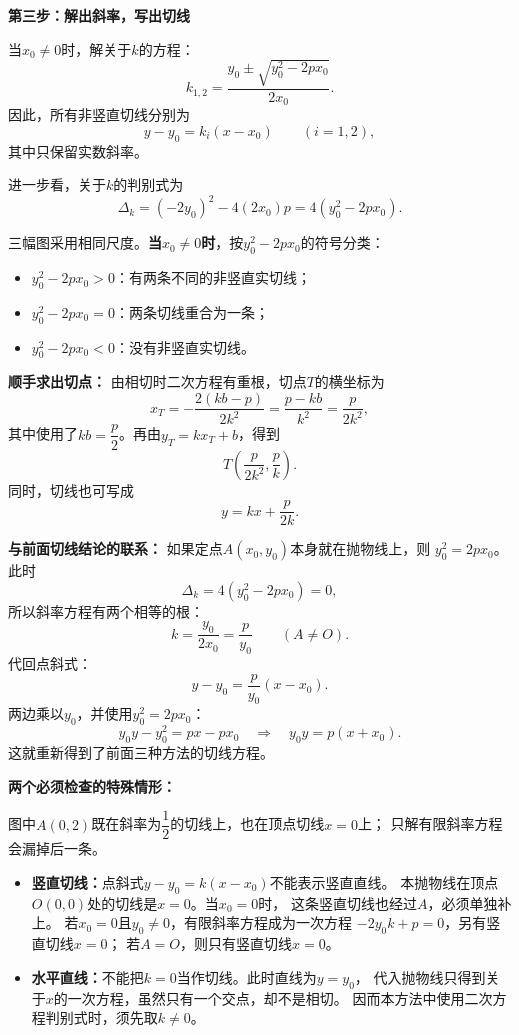 \begin{proofbox}
\textbf{第三步：解出斜率，写出切线}

当$x_0\ne0$时，解关于$k$的方程：
\[
    \boxed{
    k_{1,2}=
    \frac{y_0\pm\sqrt{y_0^2-2px_0}}{2x_0}
    }.
\]
因此，所有非竖直切线分别为
\[
    \boxed{
    y-y_0=k_i(x-x_0)
    }
    \qquad (i=1,2),
\]
其中只保留实数斜率。

进一步看，关于$k$的判别式为
\[
    \Delta_k=(-2y_0)^2-4(2x_0)p
    =4(y_0^2-2px_0).
\]
\begin{center}\end{center}
三幅图采用相同尺度。\textbf{当$x_0\ne0$时}，按$y_0^2-2px_0$的符号分类：
\begin{itemize}
    \item $y_0^2-2px_0>0$：有两条不同的非竖直实切线；
    \item $y_0^2-2px_0=0$：两条切线重合为一条；
    \item $y_0^2-2px_0<0$：没有非竖直实切线。
\end{itemize}

\textbf{顺手求出切点：}
由相切时二次方程有重根，切点$T$的横坐标为
\[
    x_T=-\frac{2(kb-p)}{2k^2}
    =\frac{p-kb}{k^2}
    =\frac{p}{2k^2},
\]
其中使用了$kb=\dfrac p2$。再由$y_T=kx_T+b$，得到
\[
    \boxed{T\left(\frac{p}{2k^2},\frac pk\right)}.
\]
同时，切线也可写成
\[
    \boxed{y=kx+\frac{p}{2k}}.
\]

\textbf{与前面切线结论的联系：}
如果定点$A(x_0,y_0)$本身就在抛物线上，则
$y_0^2=2px_0$。此时
\[
    \Delta_k=4(y_0^2-2px_0)=0,
\]
所以斜率方程有两个相等的根：
\[
    k=\frac{y_0}{2x_0}=\frac p{y_0}
    \qquad (A\ne O).
\]
代回点斜式：
\[
    y-y_0=\frac p{y_0}(x-x_0).
\]
两边乘以$y_0$，并使用$y_0^2=2px_0$：
\[
    y_0y-y_0^2=px-px_0
    \quad\Longrightarrow\quad
    \boxed{y_0y=p(x+x_0)}.
\]
这就重新得到了前面三种方法的切线方程。

\textbf{两个必须检查的特殊情形：}
\begin{center}\end{center}
图中$A(0,2)$既在斜率为$\dfrac12$的切线上，也在顶点切线$x=0$上；
只解有限斜率方程会漏掉后一条。
\begin{itemize}
    \item \textbf{竖直切线：}点斜式$y-y_0=k(x-x_0)$不能表示竖直直线。
    本抛物线在顶点$O(0,0)$处的切线是$x=0$。当$x_0=0$时，
    这条竖直切线也经过$A$，必须单独补上。
    若$x_0=0$且$y_0\ne0$，有限斜率方程成为一次方程
    $-2y_0k+p=0$，另有竖直切线$x=0$；
    若$A=O$，则只有竖直切线$x=0$。
    \item \textbf{水平直线：}不能把$k=0$当作切线。此时直线为$y=y_0$，
    代入抛物线只得到关于$x$的一次方程，虽然只有一个交点，却不是相切。
    因而本方法中使用二次方程判别式时，须先取$k\ne0$。
\end{itemize}


\end{proofbox}
